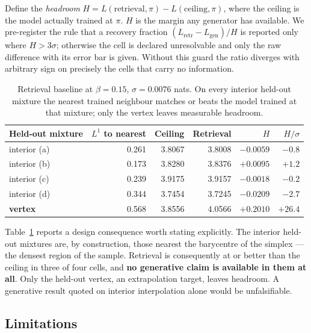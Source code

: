 Define the \emph{headroom} $H = L(\text{retrieval}, \pi) - L(\text{ceiling}, \pi)$,
where the ceiling is the model actually trained at $\pi$. $H$ is the margin any
generator has available. We pre-register the rule that a recovery fraction
$(L_{\text{retr}} - L_{\text{gen}})/H$ is reported only where $H > 3\sigma$;
otherwise the cell is declared unresolvable and only the raw difference with its error
bar is given. Without this guard the ratio diverges with arbitrary sign on precisely
the cells that carry no information.

\begin{table}[t]
\centering
\caption{Retrieval baseline at $\beta = 0.15$, $\sigma = 0.0076$ nats. On every
interior held-out mixture the nearest trained neighbour matches or beats the model
trained at that mixture; only the vertex leaves measurable headroom.}
\label{tab:retrieval}
\small
\begin{tabular}{lrrrrr}
\toprule
Held-out mixture & $L^1$ to nearest & Ceiling & Retrieval & $H$ & $H/\sigma$ \\
\midrule
interior (a) & 0.261 & 3.8067 & 3.8008 & $-0.0059$ & $-0.8$ \\
interior (b) & 0.173 & 3.8280 & 3.8376 & $+0.0095$ & $+1.2$ \\
interior (c) & 0.239 & 3.9175 & 3.9157 & $-0.0018$ & $-0.2$ \\
interior (d) & 0.344 & 3.7454 & 3.7245 & $-0.0209$ & $-2.7$ \\
\textbf{vertex} & 0.568 & 3.8556 & 4.0566 & $\mathbf{+0.2010}$ & $\mathbf{+26.4}$ \\
\bottomrule
\end{tabular}
\end{table}

Table~\ref{tab:retrieval} reports a design consequence worth stating explicitly. The
interior held-out mixtures are, by construction, those nearest the barycentre of the
simplex --- the densest region of the sample. Retrieval is consequently at or better
than the ceiling in three of four cells, and \textbf{no generative claim is available
in them at all}. Only the held-out vertex, an extrapolation target, leaves headroom.
A generative result quoted on interior interpolation alone would be unfalsifiable.

\subsection{Limitations}
\label{app:limitations}

